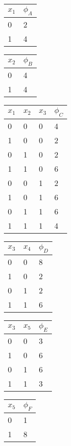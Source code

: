   \begin{center}
    \begin{tabular}{ll}
      \toprule
      $x_1$ & $\phi_A$\\
      \midrule
      0 & 2\\
      1 & 4\\
      \bottomrule
    \end{tabular}
    \hfill
    \begin{tabular}{ll}
      \toprule
      $x_2$ & $\phi_B$\\
      \midrule
      0 & 4\\
      1 & 4\\
      \bottomrule
    \end{tabular}
    \hfill
    \begin{tabular}{llll}
      \toprule
      $x_1$ & $x_2$ & $x_3$ & $\phi_C$\\
      \midrule
    0 & 0 & 0 & 4 \\
    1 & 0 & 0 & 2 \\
    0 & 1 & 0 & 2 \\
    1 & 1 & 0 & 6 \\
    0 & 0 & 1 & 2 \\
    1 & 0 & 1 & 6 \\
    0 & 1 & 1 & 6 \\
    1 & 1 & 1 & 4 \\
      \bottomrule
    \end{tabular}
    \hfill
    \begin{tabular}{lll}
      \toprule
      $x_3$ & $x_4$ & $\phi_D$\\
      \midrule
    0 & 0 &  8 \\
    1 & 0 &  2 \\
    0 & 1 &  2 \\
    1 & 1 &  6 \\
      \bottomrule
    \end{tabular}
    \hfill
    \begin{tabular}{lll}
      \toprule
      $x_3$ & $x_5$ & $\phi_E$\\
      \midrule
    0 & 0 &  3 \\
    1 & 0 &  6 \\
    0 & 1 &  6 \\
    1 & 1 &  3 \\
      \bottomrule
    \end{tabular}
   \hfill
    \begin{tabular}{ll}
      \toprule
      $x_5$ & $\phi_F$\\
      \midrule
      0 & 1\\
      1 & 8\\
      \bottomrule
    \end{tabular}

    
  \end{center}
  
